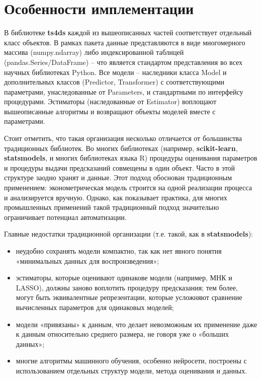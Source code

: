 \documentclass[../report.tex]{subfiles}
\begin{document}
	\section{Особенности имплементации}
	
	В библиотеке \textbf{ts4ds} каждой из вышеописанных частей соответствует отдельный класс объектов. В рамках пакета данные представляются в виде многомерного массива (numpy.ndarray) либо индексированной таблицей (pandas.Series/DataFrame) – что является стандартом представления во всех научных библиотеках Python. Все модели – наследники класса Model и дополнительных классов (Predictor, Transformer) с соответствующими параметрами, унаследованные от Parameters, и стандартными по интерфейсу процедурами. Эстиматоры (наследованные от Estimator) воплощают вышеописанные алгоритмы и возвращают объекты моделей вместе с параметрами.
	
	Стоит отметить, что такая организация несколько отличается от большинства традиционных библиотек. Во многих библиотеках (например, \textbf{scikit-learn}, \textbf{statsmodels}\cite{statsmodels}, и многих библиотеках языка R) процедуры оценивания параметров и процедуры выдачи предсказаний совмещены в один объект. Часто в этой структуре заодно хранят и данные. Этот подход обоснован традиционным применением: эконометрическая модель строится на одной  реализации процесса и анализируется вручную. Однако, как показывает практика, для многих промышленных применений такой традиционный подход значительно ограничивает потенциал автоматизации. 
	
	Главные недостатки традиционной организации (т.е. такой, как в \textbf{statsmodels}):
	
	\begin{itemize}
		\item неудобно сохранять модели компактно, так как нет явного понятия «минимальных данных для воспроизведения»;
		\item эстиматоры, которые оценивают одинакове модели (например, МНК и LASSO), должны заново воплотить процедуру предсказания; тем более, могут быть эквивалентные репрезентации, которые усложняют сравнение вычисленных параметров для одинаковых моделей;
		\item модели «привязаны» к данным, что делает невозможным их применение даже к данным относительно среднего размера, не говоря уже о «больших данных»;
		\item многие алгоритмы машинного обучения, особенно нейросети, построены с использованием отдельных структур модели, метода оценивания и данных.
	\end{itemize}
	
\end{document}
